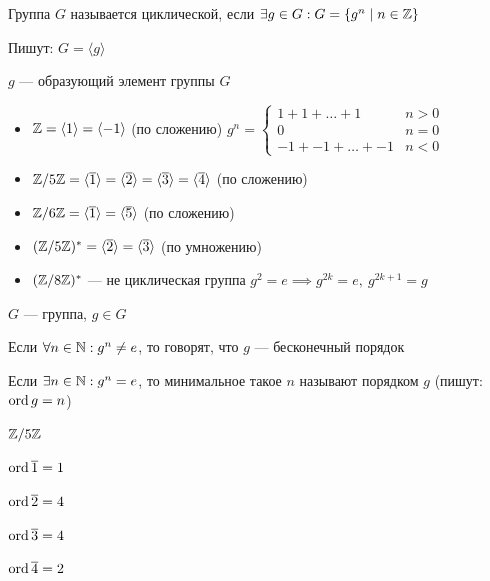 \begin{defn}
    Группа $G$ называется циклической, если $\exists g \in G : G = \{g^n \mid n \in \mathbb{Z}\}$

    Пишут: $G = \langle g \rangle$
\end{defn}

\begin{defn}
    $g$ --- образующий элемент группы $G$
\end{defn}

\begin{examples}
    \begin{itemize}
        \item $\mathbb{Z} = \langle 1 \rangle = \langle -1 \rangle$ (по сложению) $g^n = \begin{cases}
            1 + 1 + \ldots + 1 & n > 0 \\
            0 & n = 0 \\
            -1 + -1 + \ldots + -1 & n < 0
        \end{cases}$

        \item $\mathbb{Z}/5\mathbb{Z} = \langle \overline{1} \rangle = \langle \overline{2} \rangle = \langle \overline{3} \rangle = \langle \overline{4} \rangle$ (по сложению)
        
        \item $\mathbb{Z}/6\mathbb{Z} = \langle \overline{1} \rangle = \langle \overline{5} \rangle$ (по сложению)
        
        \item $(\mathbb{Z}/5\mathbb{Z})^* = \langle \overline{2} \rangle = \langle \overline{3} \rangle$ (по умножению)
        
        \item $(\mathbb{Z}/8\mathbb{Z})^*$ --- не циклическая группа $g^2 = e \implies g^{2k} = e,~g^{2k+1} = g$
    \end{itemize}
\end{examples}

\begin{defn}
    $G$ --- группа, $g \in G$

    Если $\forall n \in \mathbb{N}: g^n \neq e$, то говорят, что $g$ --- бесконечный порядок

    Если $\exists n \in \mathbb{N}: g^n = e$, то минимальное такое $n$ называют порядком $g$ (пишут: $\operatorname{ord} g = n$)
\end{defn}

\begin{example}
    $\mathbb{Z}/5\mathbb{Z}$

    $\operatorname{ord} \overline{1} = 1$

    $\operatorname{ord} \overline{2} = 4$
    
    $\operatorname{ord} \overline{3} = 4$
    
    $\operatorname{ord} \overline{4} = 2$
\end{example}

